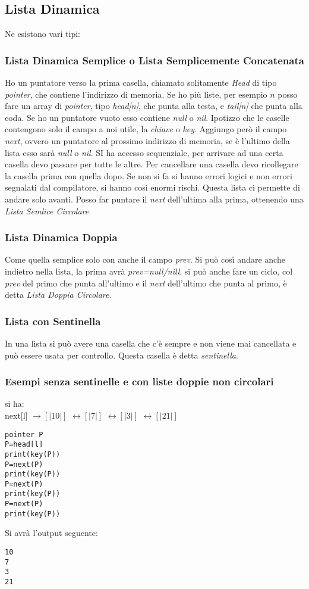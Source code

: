 \documentclass[a4paper,12pt,oneside,tikz]{book}
\begin{document}
\subsection{Lista Dinamica}
Ne esistono vari tipi:
\subsubsection{Lista Dinamica Semplice o Lista Semplicemente Concatenata}
Ho un puntatore verso la prima casella, chiamato solitamente \textit{Head} di tipo \textit{pointer}, che contiene l'indirizzo di memoria. Se ho più liste, per esempio $n$ posso fare un array di \textit{pointer}, tipo \textit{head[n]}, che punta alla testa, e \textit{tail[n]} che punta alla coda. Se ho un puntatore vuoto esso contiene \textit{null} o \textit{nil}. Ipotizzo che le caselle contengono solo il campo a noi utile, la \textit{chiave} o \textit{key}. Aggiungo però il campo \textit{next}, ovvero un puntatore al prossimo indirizzo di memoria, se è l'ultimo della lista esso sarà \textit{null} o \textit{nil}. SI ha accesso sequenziale, per arrivare ad una certa casella devo passare per tutte le altre. Per cancellare una casella devo ricollegare la casella prima con quella dopo. Se non si fa si hanno errori logici e non errori segnalati dal compilatore, si hanno così enormi rischi. Questa lista ci permette di andare solo avanti. Posso far puntare il \textit{next} dell'ultima alla prima, ottenendo una \textit{Lista Semlice Circolare}
\subsubsection{Lista Dinamica Doppia}
Come quella semplice solo con anche il campo \textit{prev}. Si può così andare anche indietro nella lista, la prima avrà \textit{prev=null/nill}. si può anche fare un ciclo, col \textit{prev} del primo che punta all'ultimo e il \textit{next} dell'ultimo che punta al primo, è detta \textit{Lista Doppia Circolare}.
\subsubsection{Lista con Sentinella}
In una lista si può avere una casella che c'è sempre e non viene mai cancellata e può essere usata per controllo. Questa casella è detta \textit{sentinella}.
\subsubsection{Esempi senza sentinelle e con liste doppie non circolari}
\begin{esempio}
	si ha:\\
	next[l] $\longrightarrow [ |10 | ]$ $\longleftrightarrow [ | 7| ]$ $\longleftrightarrow [ | 3| ]$ $\longleftrightarrow [ | 21| ]$
	\begin{verbatim}
pointer P
P=head[l]
print(key(P))
P=next(P)
print(key(P))
P=next(P)
print(key(P))
P=next(P)
print(key(P))
\end{verbatim}
	Si avrà l'output seguente:
	\begin{verbatim}
10
7
3
21
\end{verbatim}
\end{esempio}
\end{document}
